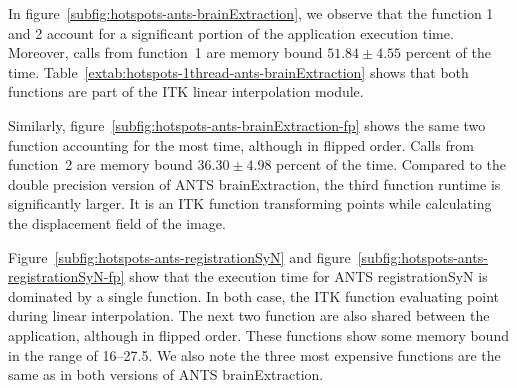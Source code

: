 \documentclass[conference]{IEEEtran}
\begin{document}
In figure~\ref{subfig:hotspots-ants-brainExtraction}, we observe that the function 1 and 2 account for a significant portion of the application execution time. Moreover, calls from function~1 are memory bound $51.84\pm{4.55}$ percent of the time. Table~\ref{extab:hotspots-1thread-ants-brainExtraction} shows that both functions are part of the ITK linear interpolation module.
					
Similarly, figure~\ref{subfig:hotspots-ants-brainExtraction-fp} shows the same two function accounting for the most time, although in flipped order. Calls from function~2 are memory bound $36.30\pm{4.98}$ percent of the time. Compared to the double precision version of ANTS brainExtraction, the third function runtime is significantly larger. It is an ITK function transforming points while calculating the displacement field of the image.
					
Figure~\ref{subfig:hotspots-ants-registrationSyN} and figure~\ref{subfig:hotspots-ants-registrationSyN-fp} show that the execution time for ANTS registrationSyN is dominated by a single function. In both case, the ITK function evaluating point during linear interpolation. The next two function are also shared between the application, although in flipped order. These functions show some memory bound in the range of 16--27.5. We also note the three most expensive functions are the same as in both versions of ANTS brainExtraction.
					
					
\end{document}

